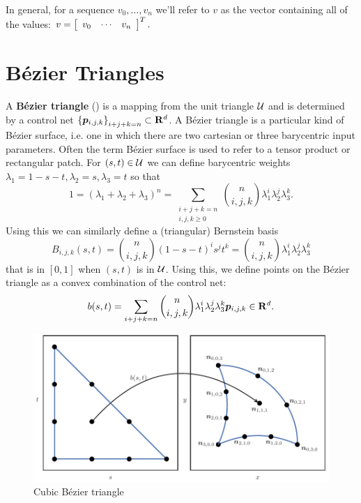In general, for a sequence \(v_0, \ldots, v_n\) we'll refer to \(v\)
as the vector containing all of the values:
\(v = \left[\begin{array}{c c c} v_0 & \cdots &
    v_n\end{array}\right]^T.\)

\section{B\'{e}zier Triangles}

A \textbf{B\'{e}zier triangle} (\cite[Chapter~17]{Farin2001}) is a
mapping from the unit triangle
\(\mathcal{U}\) and is determined by a control net
\(\left\{\bm{p}_{i, j, k}\right\}_{i + j + k = n} \subset \mathbf{R}^d\).
A B\'{e}zier triangle is a particular kind of B\'{e}zier surface, i.e. one
in which there are two cartesian or three barycentric input parameters.
Often the term B\'{e}zier surface is used to refer to a tensor product or
rectangular patch.
For \((s, t) \in \mathcal{U}\) we can define barycentric weights
\(\lambda_1 = 1 - s - t, \lambda_2 = s, \lambda_3 = t\) so that
\begin{equation}
1 = \left(\lambda_1 + \lambda_2 + \lambda_3\right)^n =
  \sum_{\substack{i + j + k = n \\ i, j, k \geq 0}} \binom{n}{i, j, k}
  \lambda_1^i \lambda_2^j \lambda_3^k.
\end{equation}
Using this we can similarly define a (triangular) Bernstein basis
\begin{equation}
B_{i, j, k}(s, t) = \binom{n}{i, j, k} (1 - s - t)^i s^j t^k
  = \binom{n}{i, j, k} \lambda_1^i \lambda_2^j \lambda_3^k
\end{equation}
that is in \(\left[0, 1\right]\) when \((s, t)\) is in \(\mathcal{U}\).
Using this, we define points on the B\'{e}zier triangle as a
convex combination of the control net:
\begin{equation}
b(s, t) = \sum_{i + j + k = n} \binom{n}{i, j, k}
  \lambda_1^i \lambda_2^j \lambda_3^k
  \bm{p}_{i, j, k} \in \mathbf{R}^d.
\end{equation}

\begin{figure}
  \includegraphics{../images/curved-mesh/main_figure01.pdf}
  \centering
  \captionsetup{width=.75\linewidth}
  \caption{Cubic B\'{e}zier triangle}
  \label{fig:cubic-bezier-example}
\end{figure}

